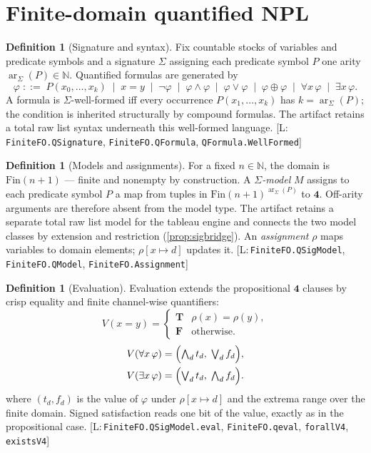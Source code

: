 \documentclass[11pt,a4paper]{article}
\theoremstyle{definition}
\newtheorem{definition}[theorem]{Definition}
\newcommand{\FOUR}{\mathbf{4}}
\newcommand{\vT}{\mathbf{T}}
\newcommand{\vF}{\mathbf{F}}
\newcommand{\hmz}{\oplus}
\newcommand{\lean}[1]{\texttt{#1}}
\begin{document}
\section{Finite-domain quantified NPL}\label{sec:syntax}

\begin{definition}[Signature and syntax]\label{def:syntax}
Fix countable stocks of variables and predicate symbols and a signature
$\Sigma$ assigning each predicate symbol $P$ one arity
$\operatorname{ar}_{\Sigma}(P)\in\mathbb{N}$. Quantified
formulas are generated by
\[
\varphi \;::=\; P(x_0,\dots,x_k) \;\mid\; x = y \;\mid\; \lnot\varphi
\;\mid\; \varphi\wedge\varphi \;\mid\; \varphi\vee\varphi \;\mid\;
\varphi\hmz\varphi \;\mid\; \forall x\,\varphi \;\mid\; \exists x\,\varphi.
\]
A formula is $\Sigma$-well-formed iff every occurrence
$P(x_1,\ldots,x_k)$ has $k=\operatorname{ar}_{\Sigma}(P)$; the condition
is inherited structurally by compound formulas. The artifact retains a
total raw list syntax underneath this well-formed language.
[L:\,\lean{FiniteFO.QSignature}, \lean{FiniteFO.QFormula},
\lean{QFormula.WellFormed}]
\end{definition}

\begin{definition}[Models and assignments]\label{def:model}
For a fixed $n\in\mathbb{N}$, the domain is $\mathrm{Fin}(n{+}1)$ — finite
and nonempty by construction. A \emph{$\Sigma$-model} $M$ assigns to each
predicate symbol $P$ a map from tuples in
$\mathrm{Fin}(n{+}1)^{\operatorname{ar}_{\Sigma}(P)}$ to $\FOUR$.
Off-arity arguments are therefore absent from the model type. The artifact
retains a separate total raw list model for the tableau engine and connects
the two model classes by extension and restriction
(\cref{prop:sigbridge}). An \emph{assignment} $\rho$
maps variables to domain elements; $\rho[x{\mapsto}d]$ updates it.
[L:\,\lean{FiniteFO.QSigModel}, \lean{FiniteFO.QModel},
\lean{FiniteFO.Assignment}]
\end{definition}

\begin{definition}[Evaluation]\label{def:eval}
Evaluation extends the propositional $\FOUR$ clauses by crisp equality and
finite channel-wise quantifiers:
\[
V(x{=}y) =
\begin{cases}
\vT & \rho(x)=\rho(y),\\
\vF & \text{otherwise}.
\end{cases}
\]
\[
\begin{aligned}
V(\forall x\,\varphi)
  &= \Bigl(\textstyle\bigwedge_{d} t_d,\;\bigvee_{d} f_d\Bigr),\\
V(\exists x\,\varphi)
  &= \Bigl(\textstyle\bigvee_{d} t_d,\;\bigwedge_{d} f_d\Bigr).
\end{aligned}
\]
where $(t_d,f_d)$ is the value of $\varphi$ under $\rho[x{\mapsto}d]$ and
the extrema range over the finite domain. Signed satisfaction reads one
bit of the value, exactly as in the propositional case.
[L:\,\lean{FiniteFO.QSigModel.eval}, \lean{FiniteFO.qeval},
\lean{forallV4}, \lean{existsV4}]
\end{definition}
\end{document}

